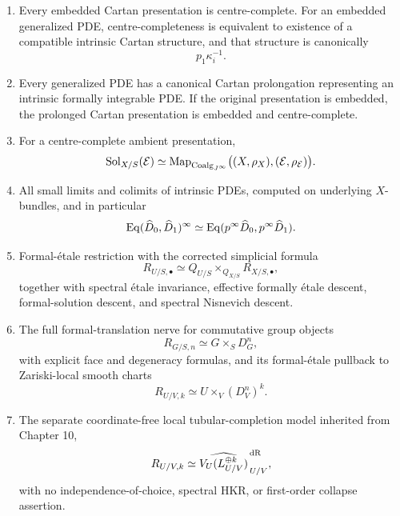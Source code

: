 \begin{theorem}
\begin{enumerate}
\item Every embedded Cartan presentation is centre-complete.  For an embedded generalized PDE, centre-completeness is equivalent to existence of a compatible intrinsic Cartan structure, and that structure is canonically
\[
    p_1\kappa_i^{-1}.
\]

\item Every generalized PDE has a canonical Cartan prolongation representing an intrinsic formally integrable PDE.  If the original presentation is embedded, the prolonged Cartan presentation is embedded and centre-complete.

\item For a centre-complete ambient presentation,
\[
    \operatorname{Sol}_{X/S}(\mathcal E)
    \simeq
    \operatorname{Map}_{\operatorname{Coalg}_{J^{\infty}}}
    \bigl((X,\rho_X),(\mathcal E,\rho_{\mathcal E})\bigr).
\]

\item All small limits and colimits of intrinsic PDEs, computed on underlying $X$-bundles, and in particular
\[
    \operatorname{Eq}(\widehat D_0,\widehat D_1)^\infty
    \simeq
    \operatorname{Eq}(p^\infty\widehat D_0,p^\infty\widehat D_1).
\]

\item Formal-\'{e}tale restriction with the corrected simplicial formula
\[
    R_{U/S,\bullet}
    \simeq
    Q_{U/S}\times_{Q_{X/S}}R_{X/S,\bullet},
\]
together with spectral \'{e}tale invariance, effective formally \'{e}tale descent, formal-solution descent, and spectral Nisnevich descent.

\item The full formal-translation nerve for commutative group objects
\[
    R_{G/S,n}\simeq G\times_SD_G^n,
\]
with explicit face and degeneracy formulas, and its formal-\'{e}tale pullback to Zariski-local smooth charts
\[
    R_{U/V,k}\simeq U\times_V(D^n_V)^k.
\]

\item The separate coordinate-free local tubular-completion model inherited from Chapter 10,
\[
    R_{U/V,k}
    \simeq
    \widehat{V_U(L_{U/V}^{\oplus k})}^{\,\mathrm{dR}}_{\,U/V},
\]
with no independence-of-choice, spectral HKR, or first-order collapse assertion.


\end{enumerate}
\end{theorem}
